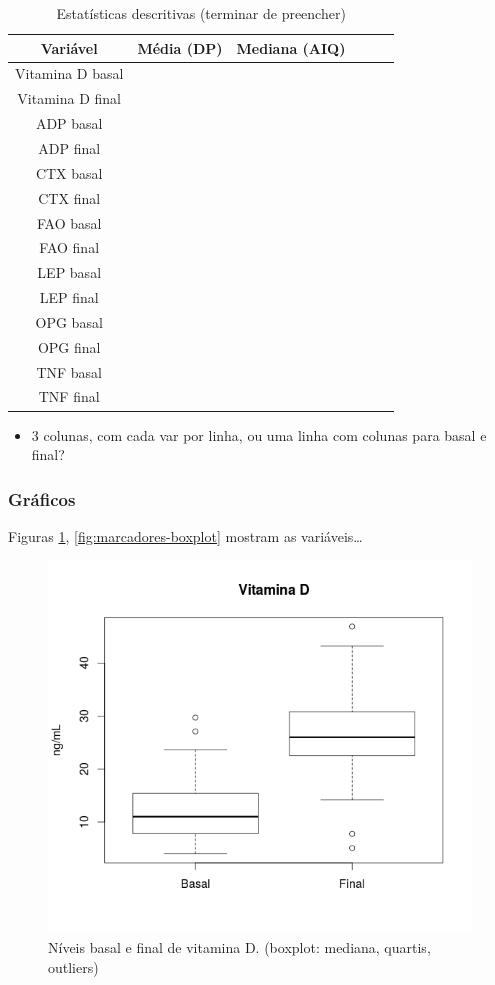 \documentclass[a4paper]{article}
\begin{document}
\begin{table}[!h]
  \centering
  \begin{tabular}{c|ccccc}
    \hline
    Variável& Média (DP) &Mediana (AIQ)&&&\\
    \hline
    \hline
    Vitamina D basal&&&&&\\
    Vitamina D final&&&&&\\
    \hline
    ADP basal &&&&&\\
    ADP final&&&&&\\
    CTX basal &&&&&\\
    CTX final&&&&&\\
    FAO basal &&&&&\\
    FAO final&&&&&\\
    LEP basal &&&&&\\
    LEP final&&&&&\\
    OPG basal &&&&&\\
    OPG final&&&&&\\
    TNF basal &&&&&\\
    TNF final&&&&&\\
    \hline
  \end{tabular}
  \caption[Estatísticas descritivas]{Estatísticas descritivas (terminar de preencher)}
\end{table}

\begin{itemize}
\item 3 colunas, com cada var por linha, ou uma linha com colunas para basal e final?
\end{itemize}

\subsubsection{Gráficos}

Figuras \ref{fig:vitd-boxplot}, \ref{fig:marcadores-boxplot} mostram as variáveis\ldots

\begin{figure}[!h]
  \centering
  \includegraphics[width=.5\textwidth]{../figuras/vitaminad}
  \caption[Níveis basal e final de vitamina D]{Níveis basal e final de vitamina D. (boxplot: mediana, quartis, outliers)}
  \label{fig:vitd-boxplot}
\end{figure}
\end{document}
